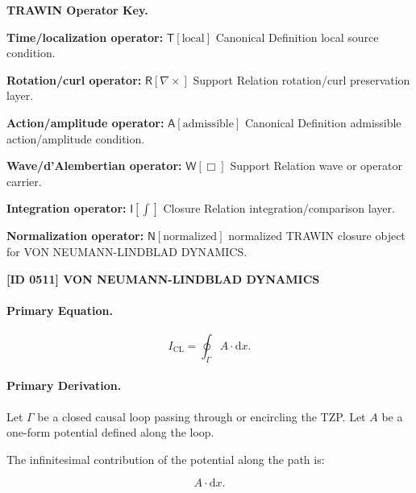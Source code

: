 \par\vspace{0.45\baselineskip}
\noindent\begin{minipage}[t]{\linewidth}
\begingroup
\small
\raggedright
\textbf{TRAWIN Operator Key.}\par
\noindent\textbf{Time/localization operator:} $\mathsf{T}\!\left[\mathrm{local}\right]$ Canonical Definition local source condition.\par
\noindent\textbf{Rotation/curl operator:} $\mathsf{R}\!\left[\nabla\times\right]$ Support Relation rotation/curl preservation layer.\par
\noindent\textbf{Action/amplitude operator:} $\mathsf{A}\!\left[\mathrm{admissible}\right]$ Canonical Definition admissible action/amplitude condition.\par
\noindent\textbf{Wave/d'Alembertian operator:} $\mathsf{W}\!\left[\Box\right]$ Support Relation wave or operator carrier.\par
\noindent\textbf{Integration operator:} $\mathsf{I}\!\left[\int\right]$ Closure Relation integration/comparison layer.\par
\noindent\textbf{Normalization operator:} $\mathsf{N}\!\left[\mathrm{normalized}\right]$ normalized TRAWIN closure object for VON NEUMANN-LINDBLAD DYNAMICS.\par
\endgroup
\end{minipage}

\clearpage
\noindent\textbf{[ID 0511] VON NEUMANN-LINDBLAD DYNAMICS}\par
\vspace{0.35em}
\paragraph{Primary Equation.}
\begin{equation}
I_{\mathrm{CL}}
=
\oint_{\Gamma} A\cdot \mathrm{d}x .
\end{equation}

\paragraph{Primary Derivation.}
Let $\Gamma$ be a closed causal loop passing through or encircling the TZP.  
Let $A$ be a one-form potential defined along the loop.

The infinitesimal contribution of the potential along the path is:

\begin{equation}
A\cdot \mathrm{d}x .
\end{equation}

